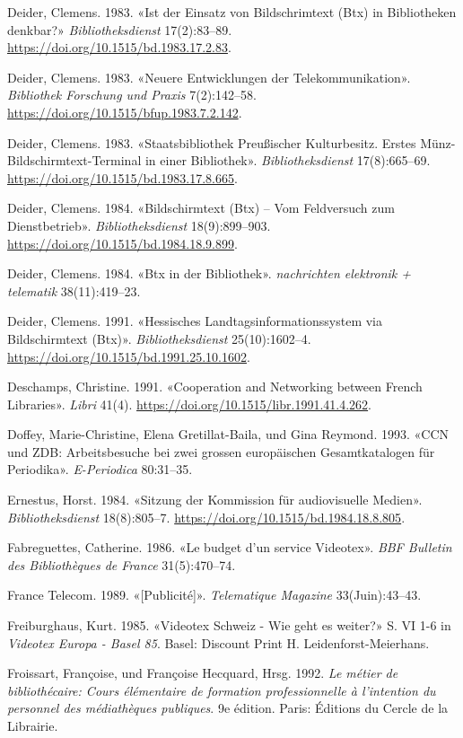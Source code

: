 \documentclass[a4paper,
fontsize=11pt,
oneside,
numbers=noperiodatend,
parskip=half-,
bibliography=totoc,
final
]{scrartcl}
\begin{document}
Deider, Clemens. 1983. «Ist der Einsatz von Bildschrimtext (Btx) in
Bibliotheken denkbar?» \emph{Bibliotheksdienst} 17(2):83--89.
\url{https://doi.org/10.1515/bd.1983.17.2.83}.

Deider, Clemens. 1983. «Neuere Entwicklungen der Telekommunikation».
\emph{Bibliothek Forschung und Praxis} 7(2):142--58.
\url{https://doi.org/10.1515/bfup.1983.7.2.142}.

Deider, Clemens. 1983. «Staatsbibliothek Preußischer Kulturbesitz.
Erstes Münz-Bildschirmtext-Terminal in einer Bibliothek».
\emph{Bibliotheksdienst} 17(8):665--69.
\url{https://doi.org/10.1515/bd.1983.17.8.665}.

Deider, Clemens. 1984. «Bildschirmtext (Btx) -- Vom Feldversuch zum
Dienstbetrieb». \emph{Bibliotheksdienst} 18(9):899--903.
\url{https://doi.org/10.1515/bd.1984.18.9.899}.

Deider, Clemens. 1984. «Btx in der Bibliothek». \emph{nachrichten
elektronik + telematik} 38(11):419--23.

Deider, Clemens. 1991. «Hessisches Landtagsinformationssystem via
Bildschirmtext (Btx)». \emph{Bibliotheksdienst} 25(10):1602--4.
\url{https://doi.org/10.1515/bd.1991.25.10.1602}.

Deschamps, Christine. 1991. «Cooperation and Networking between French
Libraries». \emph{Libri} 41(4).
\url{https://doi.org/10.1515/libr.1991.41.4.262}.

Doffey, Marie-Christine, Elena Gretillat-Baila, und Gina Reymond. 1993.
«CCN und ZDB: Arbeitsbesuche bei zwei grossen europäischen
Gesamtkatalogen für Periodika». \emph{E-Periodica} 80:31--35.

Ernestus, Horst. 1984. «Sitzung der Kommission für audiovisuelle
Medien». \emph{Bibliotheksdienst} 18(8):805--7.
\url{https://doi.org/10.1515/bd.1984.18.8.805}.

Fabreguettes, Catherine. 1986. «Le budget d'un service Videotex».
\emph{BBF Bulletin des Bibliothèques de France} 31(5):470--74.

France Telecom. 1989. «{[}Publicité{]}». \emph{Telematique Magazine}
33(Juin):43--43.

Freiburghaus, Kurt. 1985. «Videotex Schweiz - Wie geht es weiter?» S. VI
1-6 in \emph{Videotex Europa - Basel 85}. Basel: Discount Print H.
Leidenforst-Meierhans.

Froissart, Françoise, und Françoise Hecquard, Hrsg. 1992. \emph{Le
métier de bibliothécaire: Cours élémentaire de formation professionnelle
à l'intention du personnel des médiathèques publiques}. 9e édition.
Paris: Éditions du Cercle de la Librairie.
\end{document}
